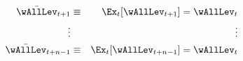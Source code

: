 \begin{eqnarray*}
  \label{eq:ztBar}
    \bar{\wAllLev}_{t+1} & \equiv & \Ex_{t}[\wAllLev_{t+1}] = \wAllLev_{t}
\\    \vdots &  & \vdots \nonumber
\\    \bar{\wAllLev}_{t+n-1} & \equiv & \Ex_{t}[\wAllLev_{t+n-1}] = \wAllLev_{t}
\end{eqnarray*}
